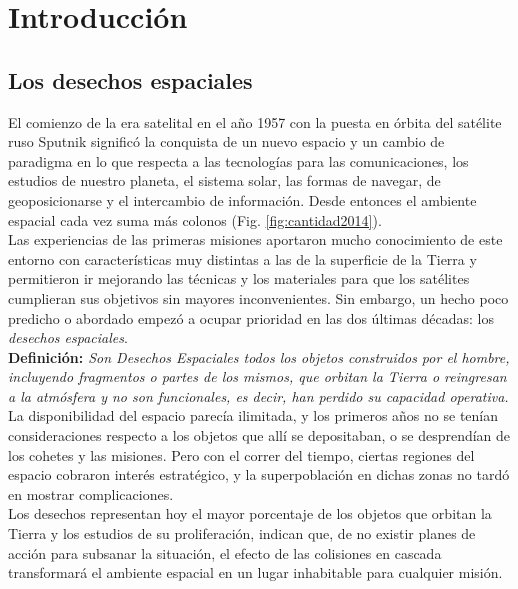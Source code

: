 \chapter{Introducción}
\label{chap:introduccion}


\section{Los desechos espaciales}

El comienzo de la era satelital en el a\~no 1957 con la puesta en \'orbita del sat\'elite ruso Sputnik signific\'o la conquista de un nuevo espacio y un cambio de paradigma en lo que respecta a las tecnolog\'ias para las comunicaciones, los estudios de nuestro planeta, el sistema solar, las formas de navegar, de geoposicionarse y el intercambio de informaci\'on. Desde entonces el ambiente espacial cada vez suma m\'as colonos (Fig. \ref{fig:cantidad2014}).\\

Las experiencias de las primeras misiones aportaron mucho conocimiento de este entorno con caracter\'isticas muy distintas a las de la superficie de la Tierra y permitieron ir mejorando las t\'ecnicas y los materiales para que los sat\'elites cumplieran sus objetivos sin mayores inconvenientes.
Sin embargo, un hecho poco predicho o abordado empez\'o a ocupar prioridad en las dos \'ultimas d\'ecadas: los {\it{desechos espaciales}}.\\

{\bf{Definici\'on:}}{\it{ Son Desechos Espaciales todos los objetos construidos por el hombre, incluyendo fragmentos o partes de los mismos, que orbitan la Tierra o reingresan a la atm\'osfera y no son funcionales, es decir, han perdido su capacidad operativa.}} \citep{iadcguide}\\

La disponibilidad del espacio parec\'ia ilimitada, y los primeros a\~nos no se ten\'ian consideraciones respecto a los objetos que all\'i se depositaban, o se desprend\'ian de los cohetes y las misiones. Pero con el correr del tiempo, ciertas regiones del espacio cobraron inter\' es estrat\'egico, y la superpoblaci\'on en dichas zonas no tard\'o en mostrar complicaciones.\\

Los desechos representan hoy el mayor porcentaje de los objetos que orbitan la Tierra y los estudios de su proliferaci\'on, indican que, de no existir planes de acci\'on para subsanar la situaci\'on, el efecto de las colisiones en cascada transformar\'a el ambiente espacial en un lugar inhabitable para cualquier misi\'on.\\

